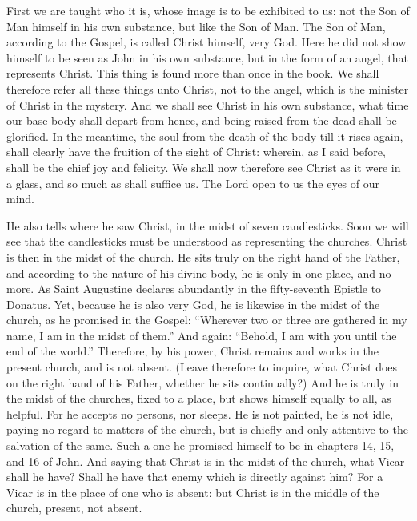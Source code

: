 First we are taught who it is, whose image is to be exhibited to us: not the Son of Man himself in his own substance, but like the Son of Man. The Son of Man, according to the Gospel, is called Christ himself, very God. Here he did not show himself to be seen as John in his own substance, but in the form of an angel, that represents Christ. This thing is found more than once in the book. We shall therefore refer all these things unto Christ, not to the angel, which is the minister of Christ in the mystery. And we shall see Christ in his own substance, what time our base body shall depart from hence, and being raised from the dead shall be glorified. In the meantime, the soul from the death of the body till it rises again, shall clearly have the fruition of the sight of Christ: wherein, as I said before, shall be the chief joy and felicity. We shall now therefore see Christ as it were in a glass, and so much as shall suffice us. The Lord open to us the eyes of our mind.

He also tells where he saw Christ, in the midst of seven candlesticks. Soon we will see that the candlesticks must be understood as representing the churches. Christ is then in the midst of the church. He sits truly on the right hand of the Father, and according to the nature of his divine body, he is only in one place, and no more. As Saint Augustine declares abundantly in the fifty-seventh Epistle to Donatus. Yet, because he is also very God, he is likewise in the midst of the church, as he promised in the Gospel: “Wherever two or three are gathered in my name, I am in the midst of them.” And again: “Behold, I am with you until the end of the world.” Therefore, by his power, Christ remains and works in the present church, and is not absent. (Leave therefore to inquire, what Christ does on the right hand of his Father, whether he sits continually?) And he is truly in the midst of the churches, fixed to a place, but shows himself equally to all, as helpful. For he accepts no persons, nor sleeps. He is not painted, he is not idle, paying no regard to matters of the church, but is chiefly and only attentive to the salvation of the same. Such a one he promised himself to be in chapters 14, 15, and 16 of John. And saying that Christ is in the midst of the church, what Vicar shall he have? Shall he have that enemy which is directly against him? For a Vicar is in the place of one who is absent: but Christ is in the middle of the church, present, not absent.

